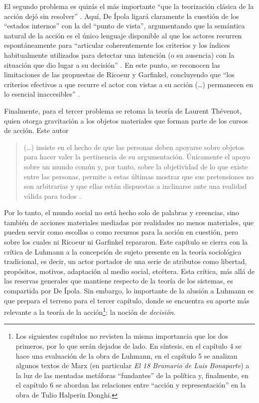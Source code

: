 El segundo problema es quizás el más importante \enquote{que la teorización clásica de la acción dejó sin resolver} \parencite[47]{1600-DEIPOLA2001}. Aquí, De Ípola ligará claramente la cuestión de los \enquote{estados internos} con la del \enquote{punto de vista}, argumentando que la semántica natural de la acción es el único lenguaje disponible al que los actores recurren espontáneamente para \enquote{articular coherentemente los criterios y los índices habitualmente utilizados para detectar una intención (o su ausencia) con la situación que dio lugar a su decisión} \parencite[50]{1600-DEIPOLA2001}. En este punto, se reconocen las limitaciones de las propuestas de Ricoeur y Garfinkel, concluyendo que \enquote{los criterios efectivos a que recurre el actor con vistas a su acción (\dots) permanecen en lo esencial inaccesibles} \parencite[52]{1600-DEIPOLA2001}.

Finalmente, para el tercer problema se retoma la teoría de Laurent Thévenot, quien otorga gravitación a los objetos materiales que forman parte de los cursos de acción. Este autor

\begin{quote}
(\dots) insiste en el hecho de que las personas deben apoyarse sobre objetos para hacer valer la pertinencia de su argumentación. Únicamente el apoyo sobre un mundo común y, por tanto, sobre la objetividad de lo que existe entre las personas, permite a estas últimas mostrar que sus pretensiones no son arbitrarias y que ellas están dispuestas a inclinarse ante una realidad válida para todos \parencite[52]{1600-DEIPOLA2001}.
\end{quote}

Por lo tanto, el mundo social no está hecho solo de palabras y creencias, sino también de acciones materiales mediadas por realidades no menos materiales, que pueden servir como escollos o como recursos para la acción en cuestión, pero sobre los cuales ni Ricoeur ni Garfinkel repararon. Este capítulo se cierra con la crítica de Luhmann a la concepción de sujeto presente en la teoría sociológica tradicional, es decir, un actor portador de una serie de atributos como libertad, propósitos, motivos, adaptación al medio social, etcétera. Esta crítica, más allá de las reservas generales que mantiene respecto de la teoría de los sistemas, es compartida por De Ípola. Sin embargo, lo importante de la alusión a Luhmann es que prepara el terreno para el tercer capítulo, donde se encuentra su aporte más relevante a la teoría de la acción\footnote{Los siguientes capítulos no revisten la misma importancia que los dos primeros, por lo que serán dejados de lado. En síntesis, en el capítulo 4 se hace una evaluación de la obra de Luhmann, en el capítulo 5 se analizan algunos textos de Marx (en particular \emph{El 18 Brumario de Luis Bonaparte}) a la luz de las mentadas metáforas \enquote{fundantes} de la política y, finalmente, en el capítulo 6 se abordan las relaciones entre \enquote{acción y representación} en la obra de Tulio Halperin Donghi.}: la noción de \emph{decisión}.

